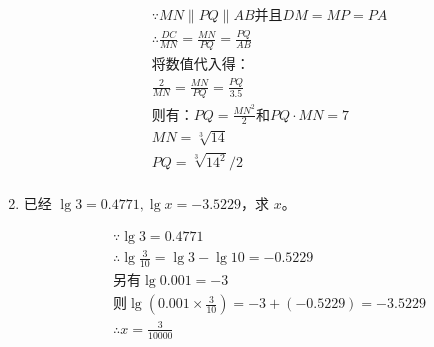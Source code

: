 \documentclass[answers]{exam}
\begin{document}
\begin{questions}
\begin{enumerate}[label=(\arabic*)]
		      \begin{solution}
			      \begin{align*}
				       & \because MN \parallel PQ \parallel AB \text{并且} DM = MP = PA \\
				       & \therefore \frac{DC}{MN} = \frac{MN}{PQ} = \frac{PQ}{AB}       \\
				       & \text{将数值代入得：}                                          \\
				       & \frac{2}{MN} = \frac{MN}{PQ} = \frac{PQ}{3.5}                  \\
				       & \text{则有：} PQ = \frac{MN^2}{2} \text{和} PQ \cdot MN = 7    \\
				       & MN = \sqrt[3]{14}                                              \\
				       & PQ = \sqrt[3]{14^2} / 2                                        \\
			      \end{align*}
		      \end{solution}
		\item 已经 \( \lg3=0.4771, \lg{x}=-3.5229 \)，求 \( x \)。
		      \begin{solution}
			      \begin{align*}
				       & \because \lg3                              = 0.4771                   \\
				       & \therefore \lg{\frac{3}{10}}               = \lg3 - \lg10 = -0.5229   \\
				       & \text{另有} \lg0.001                       = -3                       \\
				       & \text{则} \lg(0.001 \times \frac{3}{10} )  = -3 + (-0.5229) = -3.5229 \\
				       & \therefore x = \frac{3}{10000}
			      \end{align*}
		      \end{solution}
	\end{enumerate}
\end{questions}
\end{document}

